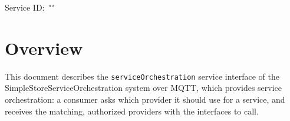 \documentclass[a4paper]{arrowhead}
\begin{document}
\sloppy

\ArrowheadSetup

\begin{center}
  \vspace*{1cm}
  \huge{\arrowtitle}

  \vspace*{0.2cm}
  \LARGE{\arrowtype}
  \vspace*{1cm}

  \Large{Service ID: \textit{"\arrowid"}}

  \vspace*{\fill}


  \vspace*{1cm}
  \vspace*{\fill}

  \begin{abstract}
    This document describes the MQTT protocol with TLS payload security and JSON payload encoding variant of the \texttt{service\allowbreak{}Orchestration} service of the SimpleStoreServiceOrchestration system.
  \end{abstract}

  \vspace*{1cm}
\end{center}

\newpage

\tableofcontents
\newpage

\section{Overview}
\label{sec:overview}

This document describes the \texttt{service\allowbreak{}Orchestration} service interface of the SimpleStoreServiceOrchestration system over MQTT, which provides service orchestration: a consumer asks which provider it should use for a service, and receives the matching, authorized providers with the interfaces to call.
\end{document}
